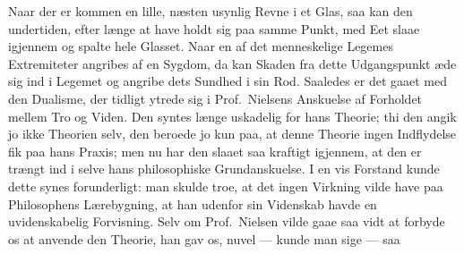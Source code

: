 Naar der er kommen en lille, næsten usynlig Revne i et Glas, saa kan
den undertiden, efter længe at have holdt sig paa samme Punkt, med Eet slaae
igjennem og spalte hele Glasset. Naar en af det menneskelige Legemes
Extremiteter angribes af en Sygdom, da kan Skaden fra dette Udgangspunkt æde
sig ind i Legemet og angribe dets Sundhed i sin Rod. Saaledes er det gaaet med
den Dualisme, der tidligt ytrede
sig i Prof.\ Nielsens Anskuelse af Forholdet mellem Tro og Viden. Den syntes
længe uskadelig for hans Theorie; thi den angik jo ikke Theorien selv, den
beroede jo kun paa, at denne Theorie ingen Indflydelse fik paa hans Praxis; men
nu har den slaaet saa kraftigt igjennem, at den er trængt ind i selve hans
philosophiske Grundanskuelse. I en vis Forstand kunde dette synes forunderligt: man skulde troe, at
det ingen Virkning vilde have paa
Philosophens Lærebygning, at han udenfor sin Videnskab havde en
uvidenskabelig Forvisning. Selv om Prof.\ Nielsen vilde gaae saa vidt at
forbyde os at anvende den Theorie, han gav os, nuvel --- kunde man sige --- saa
